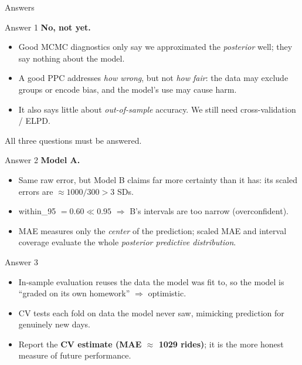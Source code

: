 \documentclass[aspectratio=43,11pt]{beamer}
\begin{document}
{
\begin{frame}
  \centering\Large Answers
\end{frame}

\begin{frame}{Answer 1}
  \textbf{No, not yet.}
  \begin{itemize}
    \item Good MCMC diagnostics only say we approximated the
      \emph{posterior} well; they say nothing about the model.
    \item A good PPC addresses \emph{how wrong}, but not
      \emph{how fair}: the data may exclude groups or encode bias,
      and the model's use may cause harm.
    \item It also says little about \emph{out-of-sample} accuracy.
      We still need cross-validation / ELPD.
  \end{itemize}
  All three questions must be answered.
\end{frame}

\begin{frame}{Answer 2}
  \textbf{Model A.}
  \begin{itemize}
    \item Same raw error, but Model B claims far more certainty than it
      has: its scaled errors are $\approx 1000/300 > 3$ SDs.
    \item within\_95 $= 0.60 \ll 0.95$ $\Rightarrow$ B's intervals are
      too narrow (overconfident).
    \item MAE measures only the \emph{center} of the prediction;
      scaled MAE and interval coverage evaluate the whole
      \emph{posterior predictive distribution}.
  \end{itemize}
\end{frame}

\begin{frame}{Answer 3}
  \begin{itemize}
    \item In-sample evaluation reuses the data the model was fit to,
      so the model is ``graded on its own homework'' $\Rightarrow$
      optimistic.
    \item CV tests each fold on data the model never saw, mimicking
      prediction for genuinely new days.
    \item Report the \textbf{CV estimate (MAE $\approx$ 1029 rides)};
      it is the more honest measure of future performance.
  \end{itemize}
\end{frame}

}
\end{document}
